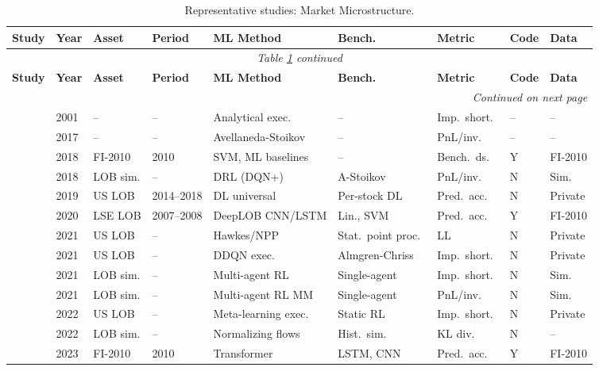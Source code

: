 \begin{longtable}{p{2.4cm} p{0.6cm} p{1.0cm} p{1.0cm} p{2.0cm} p{1.5cm} p{1.3cm} p{0.7cm} p{1.3cm}}
\caption{Representative studies: Market Microstructure.}\label{tab:master_microstructure} \\
\toprule
\textbf{Study} & \textbf{Year} & \textbf{Asset} & \textbf{Period} & \textbf{ML Method} & \textbf{Bench.} & \textbf{Metric} & \textbf{Code} & \textbf{Data} \\
\midrule
\endfirsthead
\multicolumn{9}{c}{\textit{Table \ref{tab:master_microstructure} continued}} \\
\toprule
\textbf{Study} & \textbf{Year} & \textbf{Asset} & \textbf{Period} & \textbf{ML Method} & \textbf{Bench.} & \textbf{Metric} & \textbf{Code} & \textbf{Data} \\
\midrule
\endhead
\midrule
\multicolumn{9}{r}{\textit{Continued on next page}} \\
\endfoot
\bottomrule
\endlastfoot

\citet{Almgren2001}    & 2001 & --       & --         & Analytical exec.\  & --             & Imp.\ short.\ & -- & --     \\
\citet{Gueant2017}     & 2017 & --       & --         & Avellaneda-Stoikov &--              & PnL/inv.\     & -- & --     \\
\citet{Ntakaris2018}   & 2018 & FI-2010  & 2010       & SVM, ML baselines  & --             & Bench.\ ds.\  & Y & FI-2010 \\
\citet{Spooner2018}    & 2018 & LOB sim. & --         & DRL (DQN+)         & A-Stoikov      & PnL/inv.\     & N & Sim.   \\
\citet{Sirignano2019}  & 2019 & US LOB   & 2014--2018 & DL universal       & Per-stock DL   & Pred.\ acc.\  & N & Private \\
\citet{Zhang2019LOB}   & 2020 & LSE LOB  & 2007--2008 & DeepLOB CNN/LSTM   & Lin., SVM      & Pred.\ acc.\  & Y & FI-2010 \\
\citet{Cont2021}       & 2021 & US LOB   & --         & Hawkes/NPP         & Stat.\ point proc.\ & LL       & N & Private \\
\citet{Ning2021}       & 2021 & US LOB   & --         & DDQN exec.\        & Almgren-Chriss & Imp.\ short.\ & N & Private \\
\citet{Fang2021}       & 2021 & LOB sim. & --         & Multi-agent RL     & Single-agent   & Imp.\ short.\ & N & Sim.   \\
\citet{Gasperov2021}   & 2021 & LOB sim. & --         & Multi-agent RL MM  & Single-agent   & PnL/inv.\     & N & Sim.   \\
\citet{Schnaubelt2022} & 2022 & US LOB   & --         & Meta-learning exec.\ & Static RL    & Imp.\ short.\ & N & Private \\
\citet{Shi2022}        & 2022 & LOB sim. & --         & Normalizing flows  & Hist.\ sim.\   & KL div.\      & N & --     \\
\citet{Kolm2023}       & 2023 & FI-2010  & 2010       & Transformer        & LSTM, CNN      & Pred.\ acc.\  & Y & FI-2010 \\

\end{longtable}

